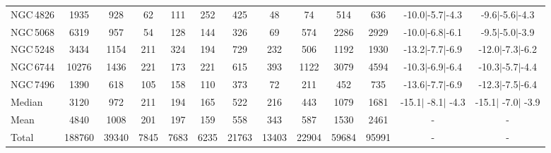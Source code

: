 \begin{table*}
\begin{center}
\begin{tabular}{lcccccccccccc}
NGC\,4826 & 1935 & 928 & 62 & 111 & 252 & 425 & 48 & 74 & 514 & 636 & -10.0$\vert$-5.7$\vert$-4.3 & -9.6$\vert$-5.6$\vert$-4.3 \\ 
NGC\,5068 & 6319 & 957 & 54 & 128 & 144 & 326 & 69 & 574 & 2286 & 2929 & -10.0$\vert$-6.8$\vert$-6.1 & -9.5$\vert$-5.0$\vert$-3.9 \\ 
NGC\,5248 & 3434 & 1154 & 211 & 324 & 194 & 729 & 232 & 506 & 1192 & 1930 & -13.2$\vert$-7.7$\vert$-6.9 & -12.0$\vert$-7.3$\vert$-6.2 \\ 
NGC\,6744 & 10276 & 1436 & 221 & 173 & 221 & 615 & 393 & 1122 & 3079 & 4594 & -10.3$\vert$-6.9$\vert$-6.4 & -10.3$\vert$-5.7$\vert$-4.4 \\ 
NGC\,7496 & 1390 & 618 & 105 & 158 & 110 & 373 & 72 & 211 & 452 & 735 & -13.6$\vert$-7.7$\vert$-6.9 & -12.3$\vert$-7.5$\vert$-6.4 \\ 
\hline
Median & 3120 & 972 & 211 & 194 & 165 & 522 & 216 & 443 & 1079 & 1681 & -15.1$\vert$ -8.1$\vert$ -4.3 & -15.1$\vert$ -7.0$\vert$ -3.9 \\ 
Mean & 4840 & 1008 & 201 & 197 & 159 & 558 & 343 & 587 & 1530 & 2461 & - & - \\ 
Total & 188760 & 39340 & 7845 & 7683 & 6235 & 21763 & 13403 & 22904 & 59684 & 95991 & - & - \\ 
\hline
\hline
\end{tabular} 
\end{center}
\end{table*}
%